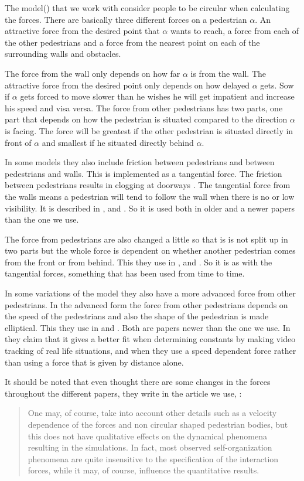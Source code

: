 The model(\cite{self-org}) that we work with consider people to be circular when calculating the forces.
There are basically three different forces on a pedestrian $\alpha$. An attractive force from the
desired point that $\alpha$ wants to reach, a force from each of the other pedestrians and
a force from the nearest point on each of the surrounding walls and obstacles.

The force from the wall only depends on how far $\alpha$ is from the wall. The attractive force from the desired point only depends on how delayed $\alpha$ gets. Sow if $\alpha$ gets forced to move slower than he wishes he will get impatient and increase his speed and visa versa.
The force from other pedestrians has two parts, one part that depends on how the pedestrian is situated compared to the direction $\alpha$ is facing. The force will be greatest if the other pedestrian is situated directly in front of $\alpha$ and smallest if he situated directly behind $\alpha$.

In some models they also include friction between pedestrians and between pedestrians and walls. This is implemented as a tangential force. The friction between pedestrians results in clogging at doorways \cite{ABconstant}. The tangential force from the walls
means a pedestrian will tend to follow the wall when there is no or low visibility. It is described in \cite{helbing00}, and \cite{HelbingNew}.
So it is used both in older and a newer papers than the one we use.

The force from pedestrians are also changed a little so that is is not split up in two parts but the whole force is dependent
on whether another pedestrian comes from the front or from behind. This they use in \cite{ABconstant},
\cite{HelbingNew} and  \cite{helbing00}. So it is as with the tangential forces, something that has been used from time to time.

In some variations of the model they also have a more advanced force from other pedestrians.
In the advanced form the force from other pedestrians depends on the speed of the pedestrians
and also the shape of the pedestrian is made elliptical. This they use in \cite{HelbingNew} and \cite{ABconstant}.
Both are papers newer than the one we use. In \cite{ABconstant} they claim that it gives a better fit when
determining constants by making video tracking of real life situations, and when they use a speed dependent
force rather than using a force that is given by distance alone.

It should be noted that even thought there are some changes in the forces throughout the different papers,
they write in the article we use, \cite{self-org}:
\begin{quote}
 One may, of
course, take into account other details such as a velocity
dependence of the forces and non circular shaped
pedestrian bodies, but this does not have qualitative
effects on the dynamical phenomena resulting in the
simulations. In fact, most observed self-organization
phenomena are quite insensitive to the specification
of the interaction forces, while it may, of course, influence
the quantitative results.
\end{quote}

